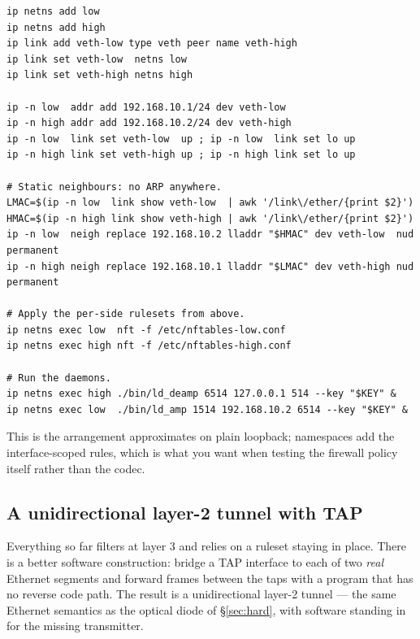 \documentclass[11pt,a4paper]{article}
\begin{document}
\begin{lstlisting}[style=shell]
ip netns add low
ip netns add high
ip link add veth-low type veth peer name veth-high
ip link set veth-low  netns low
ip link set veth-high netns high

ip -n low  addr add 192.168.10.1/24 dev veth-low
ip -n high addr add 192.168.10.2/24 dev veth-high
ip -n low  link set veth-low  up ; ip -n low  link set lo up
ip -n high link set veth-high up ; ip -n high link set lo up

# Static neighbours: no ARP anywhere.
LMAC=$(ip -n low  link show veth-low  | awk '/link\/ether/{print $2}')
HMAC=$(ip -n high link show veth-high | awk '/link\/ether/{print $2}')
ip -n low  neigh replace 192.168.10.2 lladdr "$HMAC" dev veth-low  nud permanent
ip -n high neigh replace 192.168.10.1 lladdr "$LMAC" dev veth-high nud permanent

# Apply the per-side rulesets from above.
ip netns exec low  nft -f /etc/nftables-low.conf
ip netns exec high nft -f /etc/nftables-high.conf

# Run the daemons.
ip netns exec high ./bin/ld_deamp 6514 127.0.0.1 514 --key "$KEY" &
ip netns exec low  ./bin/ld_amp 1514 192.168.10.2 6514 --key "$KEY" &
\end{lstlisting}

This is the arrangement  approximates on plain
loopback; namespaces add the interface-scoped rules, which is what you want
when testing the firewall policy itself rather than the codec.

\subsection{A unidirectional layer-2 tunnel with TAP}
\label{sec:tap}

Everything so far filters at layer 3 and relies on a ruleset staying in place.
There is a better software construction: bridge a TAP interface to each of two
\emph{real} Ethernet segments and forward frames between the taps with a
program that has no reverse code path. The result is a unidirectional
layer-2 tunnel --- the same Ethernet semantics as the optical diode of
\S\ref{sec:hard}, with software standing in for the missing transmitter.
\end{document}
